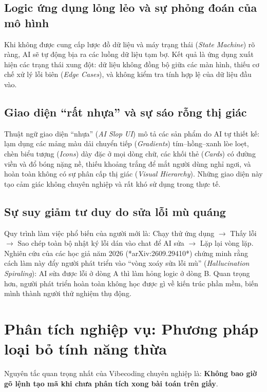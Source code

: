 \documentclass[a4paper,11pt]{article}
\begin{document}
\subsection{Logic ứng dụng lỏng lẻo và sự phỏng đoán của mô hình}

Khi không được cung cấp lược đồ dữ liệu và máy trạng thái (\textit{State Machine}) rõ ràng, AI sẽ tự động bịa ra các luồng dữ liệu tạm bợ. Kết quả là ứng dụng xuất hiện các trạng thái xung đột: dữ liệu không đồng bộ giữa các màn hình, thiếu cơ chế xử lý lỗi biên (\textit{Edge Cases}), và không kiểm tra tính hợp lệ của dữ liệu đầu vào.

\subsection{Giao diện ``rất nhựa'' và sự sáo rỗng thị giác}

Thuật ngữ giao diện ``nhựa'' (\textit{AI Slop UI}) mô tả các sản phẩm do AI tự thiết kế: lạm dụng các mảng màu dải chuyển tiếp (\textit{Gradients}) tím--hồng--xanh lòe loẹt, chèn biểu tượng (\textit{Icons}) dày đặc ở mọi dòng chữ, các khối thẻ (\textit{Cards}) có đường viền và đổ bóng nặng nề, thiếu khoảng trắng để mắt người dùng nghỉ ngơi, và hoàn toàn không có sự phân cấp thị giác (\textit{Visual Hierarchy}). Những giao diện này tạo cảm giác không chuyên nghiệp và rất khó sử dụng trong thực tế.

\subsection{Sự suy giảm tư duy do sửa lỗi mù quáng}

Quy trình làm việc phổ biến của người mới là: Chạy thử ứng dụng $\to$ Thấy lỗi $\to$ Sao chép toàn bộ nhật ký lỗi dán vào chat để AI sửa $\to$ Lặp lại vòng lặp. Nghiên cứu của các học giả năm 2026 (*arXiv:2609.29410*) chứng minh rằng cách làm này đẩy người phát triển vào ``vòng xoáy sửa lỗi mù'' (\textit{Hallucination Spiraling}): AI sửa được lỗi ở dòng A thì làm hỏng logic ở dòng B. Quan trọng hơn, người phát triển hoàn toàn không học được gì về kiến trúc phần mềm, biến mình thành người thử nghiệm thụ động.

\section{Phân tích nghiệp vụ: Phương pháp loại bỏ tính năng thừa}

Nguyên tắc quan trọng nhất của Vibecoding chuyên nghiệp là: \textbf{Không bao giờ gõ lệnh tạo mã khi chưa phân tích xong bài toán trên giấy}.
\end{document}
